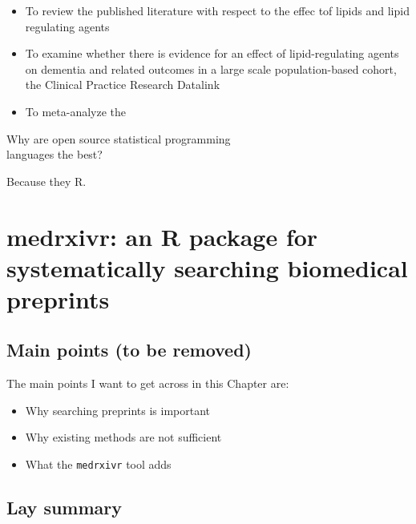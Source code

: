 \documentclass[a4paper, twoside]{templates/ociamthesis}
\providecommand{\tightlist}{%
  \setlength{\itemsep}{0pt}\setlength{\parskip}{0pt}}
\begin{document}
\begin{itemize}
\tightlist
\item
  To review the published literature with respect to the effec tof lipids and lipid regulating agents\\
\item
  To examine whether there is evidence for an effect of lipid-regulating agents on dementia and related outcomes in a large scale population-based cohort, the Clinical Practice Research Datalink
\item
  To meta-analyze the
\end{itemize}

\begin{savequote}
Why are open source statistical programming\\
languages the best?

Because they R.
\end{savequote}



\hypertarget{sys-rev-tools-heading}{%
\chapter{medrxivr: an R package for systematically searching biomedical preprints}\label{sys-rev-tools-heading}}

\minitoc 

\hypertarget{main-points-to-be-removed}{%
\section{Main points (to be removed)}\label{main-points-to-be-removed}}

The main points I want to get across in this Chapter are:

\begin{itemize}
\item
  Why searching preprints is important
\item
  Why existing methods are not sufficient
\item
  What the \texttt{medrxivr} tool adds
\end{itemize}

\hypertarget{lay-summary-1}{%
\section{Lay summary}\label{lay-summary-1}}
\end{document}
